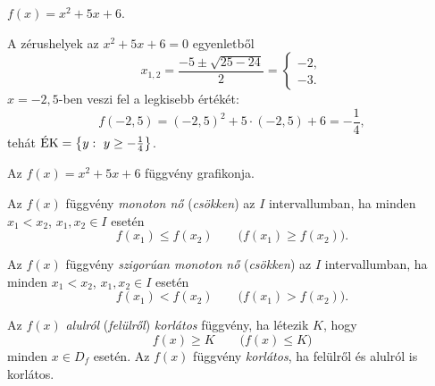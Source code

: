 \documentclass[11pt]{article}
\begin{document}
\begin{exbox}
\begin{example}
$f(x)=x^{2}+5x+6$.
\end{example}
\end{exbox}
\begin{solution}
A zérushelyek az $x^{2}+5x+6=0$ egyenletből
\[
x_{1,2}=\frac{-5\pm\sqrt{25-24}}{2}=
\begin{cases}
-2,\\
-3 .
\end{cases}
\]
$x=-2,5$-ben veszi fel a legkisebb értékét:
\[
f(-2,5)=(-2,5)^{2}+5\cdot(-2,5)+6=-\frac{1}{4},
\]
tehát $\EK=\left\{y:\ y\ge -\tfrac{1}{4}\right\}$.

\begin{notefig}{Az $f(x)=x^{2}+5x+6$ függvény grafikonja.}
\end{notefig}
\end{solution}

\begin{defbox}
\begin{definition}[Monotonitás]
Az $f(x)$ függvény \emph{monoton nő} (\emph{csökken}) az $I$ intervallumban, ha minden $x_{1}<x_{2}$, $x_{1}, x_{2}\in I$ esetén
\[
f(x_{1})\le f(x_{2})\qquad \bigl(f(x_{1})\ge f(x_{2})\bigr).
\]
\end{definition}
\end{defbox}

\begin{defbox}
\begin{definition}
Az $f(x)$ függvény \emph{szigorúan monoton nő} (\emph{csökken}) az $I$ intervallumban, ha minden $x_{1}<x_{2}$, $x_{1}, x_{2}\in I$ esetén
\[
f(x_{1})<f(x_{2})\qquad \bigl(f(x_{1})>f(x_{2})\bigr).
\]
\end{definition}
\end{defbox}

\begin{defbox}
\begin{definition}[Korlátosság]
Az $f(x)$ \emph{alulról} (\emph{felülről}) \emph{korlátos} függvény, ha létezik $K$, hogy
\[
f(x)\ge K\qquad \bigl(f(x)\le K\bigr)
\]
minden $x\in D_{f}$ esetén. Az $f(x)$ függvény \emph{korlátos}, ha felülről és alulról is korlátos.
\end{definition}
\end{defbox}
\end{document}
